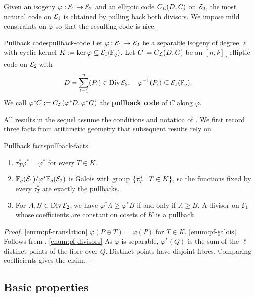 \documentclass[twocolumn, 11pt]{scrartcl}
\begin{document}
Given an isogeny $\varphi:\mathcal{E}_1\to\mathcal{E}_2$ and an elliptic code $C_\mathcal{L}(D,G)$ on $\mathcal{E}_2$, the most natural code on $\mathcal{E}_1$ is obtained by pulling back both divisors. We impose mild constraints on $\varphi$ so that the resulting code is nice.

\begin{definition}{Pullback codes}{pullback-code}
    Let $\varphi:\mathcal{E}_1\to\mathcal{E}_2$ be a separable isogeny of degree $\ell$ with cyclic kernel $K:=\ker\varphi\subseteq\mathcal{E}_1(\mathbb{F}_q)$. Let $C:=C_\mathcal{L}(D,G)$ be an $[n,k]_q$ elliptic code on $\mathcal{E}_2$ with
    \[ D=\sum_{i=1}^n (P_i)\in\operatorname{Div}\mathcal{E}_2,\quad \varphi^{-1}(P_i)\subseteq\mathcal{E}_1(\mathbb{F}_q). \]
    We call $\varphi^*C:=C_\mathcal{L}(\varphi^*D,\varphi^*G)$ the \textbf{pullback code} of $C$ along $\varphi$.
\end{definition}

All results in the sequel assume the conditions and notation of . We first record three facts from arithmetic geometry that subsequent results rely on.

\begin{lemma}{Pullback facts}{pullback-facts}
    \begin{enumerate}
        \item \label{enum:pf-translation} $\tau_T^*\varphi^*=\varphi^*$ for every $T\in K$.
        \item \label{enum:pf-galois} $\mathbb{F}_q(\mathcal{E}_1)/\varphi^*\mathbb{F}_q(\mathcal{E}_2)$ is Galois with group $\{\tau_T^*:T\in K\}$, so the functions fixed by every $\tau_T^*$ are exactly the pullbacks.
        \item \label{enum:pf-divisors} For $A,B\in\operatorname{Div}\mathcal{E}_2$, we have $\varphi^*A\geq\varphi^*B$ if and only if $A\geq B$. A divisor on $\mathcal{E}_1$ whose coefficients are constant on cosets of $K$ is a pullback.
    \end{enumerate}
\end{lemma}

\begin{proof}
\ref{enum:pf-translation} $\varphi(P\oplus T)=\varphi(P)$ for $T\in K$.
\ref{enum:pf-galois} Follows from \cite[Thm.~III.4.10]{silverman2009arithmetic}.
\ref{enum:pf-divisors} As $\varphi$ is separable, $\varphi^*(Q)$ is the sum of the $\ell$ distinct points of the fibre over $Q$. Distinct points have disjoint fibres. Comparing coefficients gives the claim.
\end{proof}

\subsection{Basic properties} \label{subsection:basic-prop}
\end{document}
